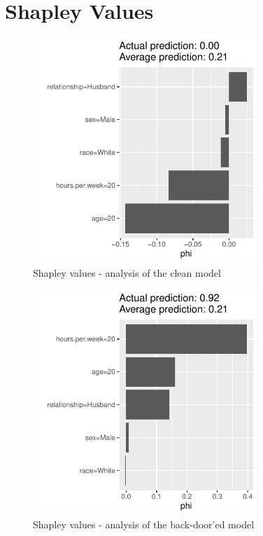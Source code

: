 \documentclass[sigconf,nonacm]{acmart}
\begin{document}
\hypertarget{shapley-values}{%
\section{Shapley Values}\label{shapley-values}}

\begin{figure}
    \includegraphics[width=8.5cm]{shapleyClean.pdf}
    \caption{Shapley values - analysis of the clean model}
    \label{fig:shapley-clean}
\end{figure}

\begin{figure}
    \includegraphics[width=8.5cm]{shapleyDirty.pdf}
    \caption{Shapley values - analysis of the back-door'ed model}
    \label{fig:shapley-dirty}
\end{figure}
\end{document}
